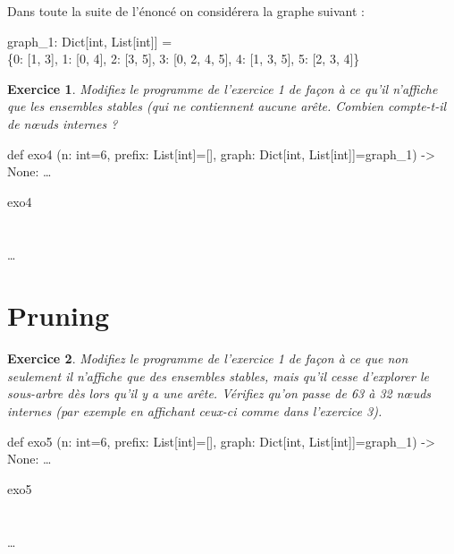 \documentclass[11pt]{article}
\newtheorem{exercice}{Exercice}
\newenvironment{python}{\ttfamily}{}
\newenvironment{signature}[1]{\begin{framed} \ttfamily def #1}{ \ldots \end{framed}}
\newenvironment{is_output}[1]{\begin{framed} \ttfamily python /\ldots /#1.py\\}{\end{framed}}
\begin{document}
Dans toute la suite de l'énoncé on considérera la graphe suivant :

\begin{python}
graph\_1: Dict[int, List[int]] =\\ \{0: [1, 3], 1: [0, 4], 2: [3, 5], 3: [0, 2, 4, 5], 4: [1, 3, 5], 5: [2, 3, 4]\}
\end{python}

\begin{exercice}
Modifiez le programme de l'exercice 1 de façon à ce qu'il n'affiche que les ensembles stables (qui ne contiennent aucune arête. Combien compte-t-il de n{\oe}uds internes ?
\end{exercice}

\begin{signature}{exo4}
(n: int=6, prefix: List[int]=[], graph: Dict[int, List[int]]=graph\_1) -> None:
\end{signature}

\begin{is_output}{exo4}
\quad [0, 0, 0, 0, 0, 0]\\
\quad [0, 0, 0, 0, 0, 1]\\
\quad [0, 0, 0, 0, 1, 0]\\
\quad [0, 0, 0, 1, 0, 0] \ldots
\end{is_output}

\section{Pruning}

\begin{exercice}
Modifiez le programme de l'exercice 1 de façon à ce que non seulement il n'affiche que des ensembles stables, mais qu'il cesse d'explorer le sous-arbre dès lors qu'il y a une arête. Vérifiez qu'on passe de 63 à 32 n{\oe}uds internes (par exemple en affichant ceux-ci comme dans l'exercice 3).
\end{exercice}

\begin{signature}{exo5}
(n: int=6, prefix: List[int]=[], graph: Dict[int, List[int]]=graph\_1) -> None:
\end{signature}

\begin{is_output}{exo5}
\quad [0, 0, 0, 0, 0, 0]\\
\quad [0, 0, 0, 0, 0, 1]\\
\quad [0, 0, 0, 0, 1, 0]\\
\quad [0, 0, 0, 1, 0, 0] \ldots
\end{is_output}
\end{document}
